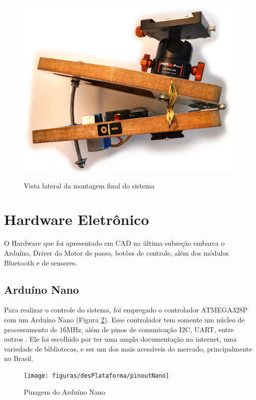 

\begin{figure}[!htb]
	\centering
	\caption{Vista lateral da montagem final do sistema}
	\includegraphics[width=.8\linewidth]{figuras/desPlataforma/montagemReal}
	\label{fig:montagemReal}
\end{figure}

\section{Hardware Eletrônico}

O Hardware que foi apresentado em CAD na última subseção embarca o Arduíno, Driver do Motor de passo, botões de controle, além dos módulos Bluetooth e de sensores. 

\subsection{Arduíno Nano}
Para realizar o controle do sistema, foi empregado o controlador ATMEGA328P com um Arduíno Nano (Figura \ref{fig:pinoutNano}). Esse controlador tem somente um núcleo de processamento de 16MHz, além de pinos de comunicação I2C, UART, entre outros \cite{man:pinoutNano}. Ele foi escolhido por ter uma ampla documentação na internet, uma variedade de bibliotecas, e ser um dos mais acessíveis do mercado, principalmente no Brasil. 

\begin{figure}[htb]
	\centering
	\caption{Pinagem do Arduíno Nano}
	\texttt{[image: figuras/desPlataforma/pinoutNano]}
	\label{fig:pinoutNano}
\end{figure}

